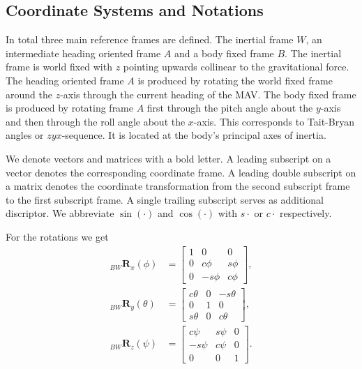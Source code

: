 \subsection{Coordinate Systems and Notations}
In total three main reference frames are defined. The inertial frame $W$, an intermediate heading oriented frame $A$ and a body fixed frame $B$. The inertial frame is world fixed with $z$ pointing upwards collinear to the gravitational force. The heading oriented frame $A$ is produced by rotating the world fixed frame around the $z$-axis through the current heading of the MAV. The body fixed frame is produced by rotating frame $A$ first through the pitch angle about the $y$-axis and then through the roll angle about the $x$-axis. This corresponds to Tait-Bryan angles or $zyx$-sequence. It is located at the body's principal axes of inertia.

We denote vectors and matrices with a bold letter. A leading subscript on a vector denotes the corresponding coordinate frame. A leading double subscript on a matrix denotes the coordinate transformation from the second subscript frame to the first subscript frame. A single trailing subscript serves as additional discriptor. We abbreviate $\sin(\cdot)$ and $\cos(\cdot)$ with $s \cdot$ or $c \cdot$ respectively.

For the rotations we get
\begin{align}
_{BW}\mathbf{R}_x (\phi)&=  \begin{bmatrix}
1 & 0 & 0 \\
0 & c\phi & s\phi \\
0 & -s\phi & c\phi
\end{bmatrix} ,\\
_{BW}\mathbf{R}_y (\theta)&=  \begin{bmatrix}
c\theta & 0 & -s\theta \\
0 & 1 & 0 \\
s\theta & 0 & c\theta
\end{bmatrix} ,\\
_{BW}\mathbf{R}_z (\psi)&=  \begin{bmatrix}
c\psi & s\psi & 0 \\
-s\psi & c\psi & 0 \\
0 & 0 &1
\end{bmatrix}.
\end{align}

